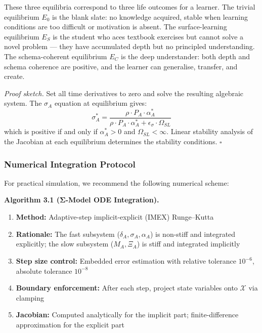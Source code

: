 \documentclass[11pt,a4paper]{article}
\begin{document}
These three equilibria correspond to three life outcomes for a learner. The trivial equilibrium $E_0$ is the blank slate: no knowledge acquired, stable when learning conditions are too difficult or motivation is absent. The surface-learning equilibrium $E_S$ is the student who aces textbook exercises but cannot solve a novel problem --- they have accumulated depth but no principled understanding. The schema-coherent equilibrium $E_C$ is the deep understander: both depth and schema coherence are positive, and the learner can generalise, transfer, and create.

\textit{Proof sketch.} Set all time derivatives to zero and solve the
resulting algebraic system. The $\sigma_A$ equation at equilibrium gives:
\begin{equation}\label{eq:sigma-equilibrium}
\sigma_A^* = \frac{\rho \cdot P_A \cdot \alpha_A^*}{\rho \cdot P_A \cdot \alpha_A^* + \epsilon_\sigma \cdot \Omega_{SL}}
\end{equation}
which is positive if and only if $\alpha_A^* > 0$ and $\Omega_{SL} < \infty$.
Linear stability analysis of the Jacobian at each equilibrium determines
the stability conditions. $\square$

\subsubsection{Numerical Integration Protocol}\label{sec:numerical-protocol}

For practical simulation, we recommend the following numerical scheme:

\textbf{Algorithm 3.1 (Σ-Model ODE Integration).}
\begin{enumerate}[nosep]
\item \textbf{Method:} Adaptive-step implicit-explicit (IMEX) Runge--Kutta
\item \textbf{Rationale:} The fast subsystem ($\delta_A, \sigma_A, \alpha_A$) is non-stiff and integrated explicitly; the slow subsystem ($\hat{M}_A, \Xi_A$) is stiff and integrated implicitly
\item \textbf{Step size control:} Embedded error estimation with relative tolerance $10^{-6}$, absolute tolerance $10^{-8}$
\item \textbf{Boundary enforcement:} After each step, project state variables onto $\mathcal{X}$ via clamping
\item \textbf{Jacobian:} Computed analytically for the implicit part; finite-difference approximation for the explicit part
\end{enumerate}
\end{document}
